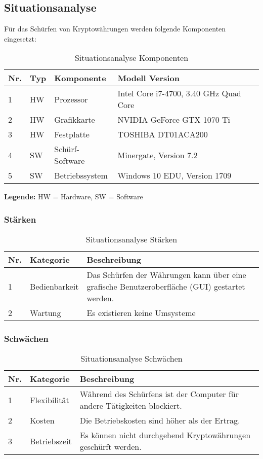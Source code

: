 \subsection{Situationsanalyse}
Für das Schürfen von Kryptowährungen werden folgende Komponenten eingesetzt:
\begin{table}[H]
\begin{tabular}[t]{p{0.5cm}p{0.8cm}p{6.7cm}p{6.7cm}}
\hline
\rowcolor{heading}\textbf{Nr.} & \textbf{Typ} & \textbf{Komponente} & \textbf{Modell \/Version} \\\hline
1 & HW & Prozessor & Intel Core i7-4700, 3.40 GHz Quad Core \\\hline
2 & HW & Grafikkarte & NVIDIA GeForce GTX 1070 Ti  \\\hline
3 & HW & Festplatte & TOSHIBA DT01ACA200  \\\hline
4 & SW & Schürf-Software & Minergate, Version 7.2  \\\hline
5 & SW & Betriebssystem & Windows 10 EDU, Version 1709 \\\hline
\end{tabular}
\caption{Situationsanalyse Komponenten}
\end{table}


\textbf{Legende:} HW = Hardware, SW = Software

\subsubsection{Stärken}
\begin{table}[H]
\begin{tabular}[t]{p{0.5cm}p{4.1cm}p{10.1cm}}
\hline
\rowcolor{heading}\textbf{Nr.} & \textbf{Kategorie} & \textbf{Beschreibung} \\\hline
1 & Bedienbarkeit & Das Schürfen der Währungen kann über eine grafische Benutzeroberfläche (GUI) gestartet werden. \\\hline
2 & Wartung & Es existieren keine Umsysteme  \\\hline
\end{tabular}
\caption{Situationsanalyse Stärken}
\end{table}

\subsubsection{Schwächen}
\begin{table}[H]
\begin{tabular}[t]{p{0.5cm}p{4.1cm}p{10.1cm}}
\hline
\rowcolor{heading}\textbf{Nr.} & \textbf{Kategorie} & \textbf{Beschreibung} \\\hline
1 & Flexibilität & Während des Schürfens ist der Computer für andere Tätigkeiten blockiert. \\\hline
2 & Kosten & Die Betriebskosten sind höher als der Ertrag.  \\\hline
3 & Betriebszeit & Es können nicht durchgehend Kryptowährungen geschürft werden.  \\\hline
\end{tabular}
\caption{Situationsanalyse Schwächen}
\end{table}